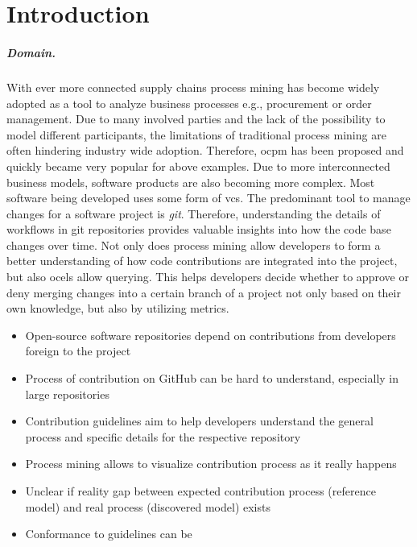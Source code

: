 \chapter{Introduction}
\label{chap:intro}

\paragraph{Domain.} With ever more connected supply chains process mining has become widely adopted as a tool to analyze business processes e.g., procurement or order management. Due to many involved parties and the lack of the possibility to model different participants, the limitations of traditional process mining are often hindering industry wide adoption. Therefore, \ac{ocpm} has been proposed and quickly became very popular for above examples. Due to more interconnected business models,  software products are also becoming more complex. Most software being developed uses some form of \ac{vcs}. The predominant tool to manage changes for a software project is \emph{git}. Therefore, understanding the details of workflows in git repositories provides valuable insights into how the code base changes over time. Not only does process mining allow developers to form a better understanding of how code contributions are integrated into the project, but also \acp{ocel} allow querying. This helps developers decide whether to approve or deny merging changes into a certain branch of a project not only based on their own knowledge, but also by utilizing metrics. 
\begin{itemize}
	\item Open-source software repositories depend on contributions from developers foreign to the project
	\item Process of contribution on GitHub can be hard to understand, especially in large repositories
	\item Contribution guidelines aim to help developers understand the general process and specific details for the respective repository 
	\item Process mining allows to visualize contribution process as it really happens
	\item Unclear if reality gap between expected contribution process (reference model) and real process (discovered model) exists
	\item Conformance to guidelines can be 
\end{itemize}
	

